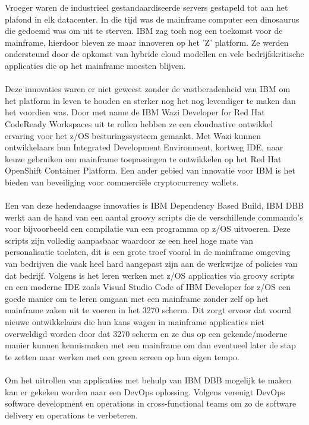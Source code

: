 Vroeger waren de industrieel gestandaardiseerde servers gestapeld tot aan het plafond in elk datacenter.
In die tijd was de mainframe computer een dinosaurus die gedoemd was om uit te sterven.
IBM zag toch nog een toekomst voor de mainframe, hierdoor bleven ze maar innoveren op het 'Z' platform.
Ze werden ondersteund door de opkomst van hybride cloud modellen en vele bedrijfskritische applicaties die op het mainframe moesten blijven. \autocite{Moorhead2022}
\\ \\
Deze innovaties waren er niet geweest zonder de vastberadenheid van IBM om het platform in leven te houden en sterker nog het nog levendiger te maken dan het voordien was.
Door met name de IBM Wazi Developer for Red Hat CodeReady Workspaces uit te rollen hebben ze een cloudnative ontwikkel ervaring voor het z/OS besturingssysteem gemaakt.
Met Wazi kunnen ontwikkelaars hun Integrated Development Environment, kortweg IDE, naar keuze gebruiken om mainframe toepassingen te ontwikkelen op het Red Hat OpenShift Container Platform.
Een ander gebied van innovatie voor IBM is het bieden van beveiliging voor commerciële cryptocurrency wallets. \autocite{Bloomberg2021}
\\ \\
Een van deze hedendaagse innovaties is IBM Dependency Based Build, IBM DBB werkt aan de hand van een aantal groovy scripts die de verschillende commando's voor bijvoorbeeld een compilatie van een programma op z/OS uitvoeren.
Deze scripts zijn volledig aanpasbaar waardoor ze een heel hoge mate van personalisatie toelaten, dit is een grote troef vooral in de mainframe omgeving van bedrijven die vaak heel hard aangepast zijn aan de werkwijze of policies van dat bedrijf.
Volgens \textcite{Porter2019} is het leren werken met z/OS applicaties via groovy scripts en een moderne IDE zoals Visual Studio Code of IBM Developer for z/OS een goede manier om te leren omgaan met een mainframe zonder zelf op het mainframe zaken uit te voeren in het 3270 scherm.
Dit zorgt ervoor dat vooral nieuwe ontwikkelaars die hun kans wagen in mainframe applicaties niet overweldigd worden door dat 3270 scherm en ze dus op een gekende/moderne manier kunnen kennismaken met een mainframe om dan eventueel later de stap te zetten naar werken met een green screen op hun eigen tempo. \autocite{Porter2019}
\\ \\
Om het uitrollen van applicaties met behulp van IBM DBB mogelijk te maken kan er gekeken worden naar een DevOps oplossing.
Volgens \textcite{Sokolowksi2021} verenigt DevOps software development en operations in cross-functional teams om zo de software delivery en operations te verbeteren.
